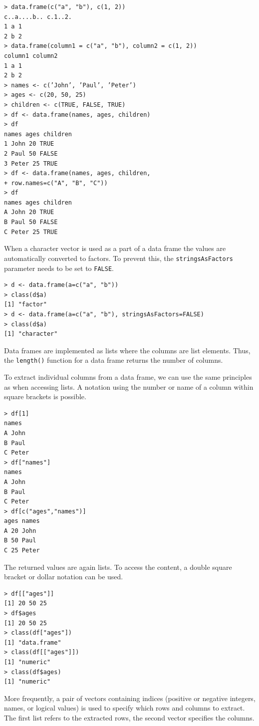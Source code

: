 \begin{verbatim}
> data.frame(c("a", "b"), c(1, 2))
c..a....b.. c.1..2.
1 a 1
2 b 2
> data.frame(column1 = c("a", "b"), column2 = c(1, 2))
column1 column2
1 a 1
2 b 2
> names <- c(’John’, ’Paul’, ’Peter’)
> ages <- c(20, 50, 25)
> children <- c(TRUE, FALSE, TRUE)
> df <- data.frame(names, ages, children)
> df
names ages children
1 John 20 TRUE
2 Paul 50 FALSE
3 Peter 25 TRUE
> df <- data.frame(names, ages, children,
+ row.names=c("A", "B", "C"))
> df
names ages children
A John 20 TRUE
B Paul 50 FALSE
C Peter 25 TRUE
\end{verbatim}

When a character vector is used as a part of a data frame the values are automatically converted to factors. To prevent this, the \texttt{stringsAsFactors} parameter needs to be set to \texttt{FALSE}.

\begin{verbatim}
> d <- data.frame(a=c("a", "b"))
> class(d$a)
[1] "factor"
> d <- data.frame(a=c("a", "b"), stringsAsFactors=FALSE)
> class(d$a)
[1] "character"
\end{verbatim}

Data frames are implemented as lists where the columns are list elements.
Thus, the \texttt{length()} function for a data frame returns the number of columns.

To extract individual columns from a data frame, we can use the same principles as when accessing lists. A notation using the number or name of a column
within square brackets is possible.

\begin{verbatim}
> df[1]
names
A John
B Paul
C Peter
> df["names"]
names
A John
B Paul
C Peter
> df[c("ages","names")]
ages names
A 20 John
B 50 Paul
C 25 Peter
\end{verbatim}

The returned values are again lists. To access the content, a double square
bracket or dollar notation can be used.

\begin{verbatim}
> df[["ages"]]
[1] 20 50 25
> df$ages
[1] 20 50 25
> class(df["ages"])
[1] "data.frame"
> class(df[["ages"]])
[1] "numeric"
> class(df$ages)
[1] "numeric"
\end{verbatim}

More frequently, a pair of vectors containing indices (positive or negative
integers, names, or logical values) is used to specify which rows and columns to
extract. The first list refers to the extracted rows, the second vector specifies the
columns.

